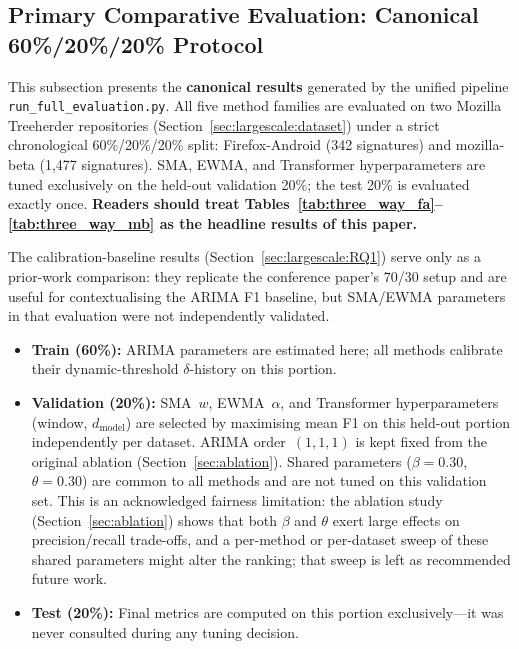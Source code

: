 \documentclass[a4paper,fleqn]{cas-sc}
\theoremstyle{plain}
\begin{document}
\subsection{Primary Comparative Evaluation: Canonical 60\%/20\%/20\% Protocol}\label{sec:three_way}

This subsection presents the \textbf{canonical results} generated by the
unified pipeline \texttt{run\_full\_evaluation.py}.
All five method families are evaluated on two Mozilla Treeherder repositories
(Section~\ref{sec:largescale:dataset}) under a strict chronological
60\%/20\%/20\% split: Firefox-Android (342 signatures) and mozilla-beta
(1{,}477 signatures).
SMA, EWMA, and Transformer hyperparameters are tuned exclusively on the
held-out validation 20\%; the test 20\% is evaluated exactly once.
\textbf{Readers should treat
Tables~\ref{tab:three_way_fa}--\ref{tab:three_way_mb} as the headline
results of this paper.}

The calibration-baseline results (Section~\ref{sec:largescale:RQ1}) serve
only as a prior-work comparison: they replicate the conference paper's 70/30
setup and are useful for contextualising the ARIMA F1 baseline, but
SMA/EWMA parameters in that evaluation were not independently validated.

\begin{itemize}
  \item \textbf{Train (60\%):} ARIMA parameters are estimated here; all methods
    calibrate their dynamic-threshold $\delta$-history on this portion.
  \item \textbf{Validation (20\%):} SMA~$w$, EWMA~$\alpha$, and Transformer
    hyperparameters (window, $d_{\text{model}}$) are selected by maximising
    mean F1 on this held-out portion independently per dataset.
    ARIMA order~$(1,1,1)$ is kept fixed from the original ablation
    (Section~\ref{sec:ablation}).
    Shared parameters ($\beta=0.30$, $\theta=0.30$) are common to all methods
    and are not tuned on this validation set.
    This is an acknowledged fairness limitation: the ablation study
    (Section~\ref{sec:ablation}) shows that both $\beta$ and $\theta$ exert
    large effects on precision/recall trade-offs, and a per-method or
    per-dataset sweep of these shared parameters might alter the ranking;
    that sweep is left as recommended future work.
  \item \textbf{Test (20\%):} Final metrics are computed on this portion
    exclusively---it was never consulted during any tuning decision.
\end{itemize}
\end{document}
